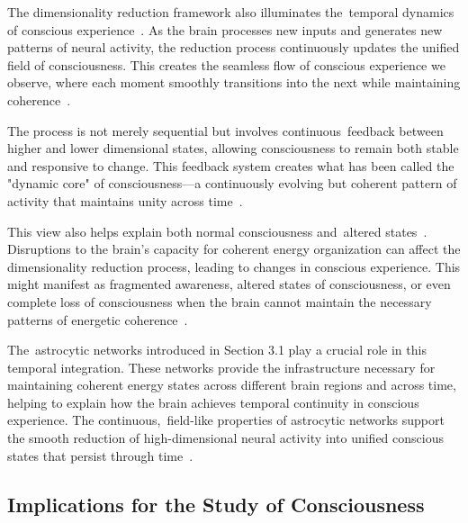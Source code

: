 The dimensionality reduction framework also illuminates the~temporal dynamics of conscious experience~\cite{varela1999present,amil2024theta}. As the brain processes new inputs and generates new patterns of neural activity, the reduction process continuously updates the unified field of consciousness. This creates the seamless flow of conscious experience we observe, where each moment smoothly transitions into the next while maintaining coherence~\cite{zheng2025unbearable,van2025processes}.

The process is not merely sequential but involves continuous~feedback between higher and lower dimensional states, allowing consciousness to remain both stable and responsive to change. This feedback system creates what has been called the "dynamic core" of consciousness—a continuously evolving but coherent pattern of activity that maintains unity across time~\cite{tononi2016integrated,bayne2010unity}.

This view also helps explain both normal consciousness and~altered states~\cite{carhart2014entropic,dehaene2011experimental}. Disruptions to the brain's capacity for coherent energy organization can affect the dimensionality reduction process, leading to changes in conscious experience. This might manifest as fragmented awareness, altered states of consciousness, or even complete loss of consciousness when the brain cannot maintain the necessary patterns of energetic coherence~\cite{mashour2020conscious,pinotsis2023vivo}.

The~astrocytic networks introduced in Section 3.1 play a crucial role in this temporal integration. These networks provide the infrastructure necessary for maintaining coherent energy states across different brain regions and across time, helping to explain how the brain achieves temporal continuity in conscious experience. The continuous,~field-like properties of astrocytic networks support the smooth reduction of high-dimensional neural activity into unified conscious states that persist through time~\cite{hunt2024electromagnetic,McFadden2020}.

\subsection*{Implications for the Study of Consciousness}

